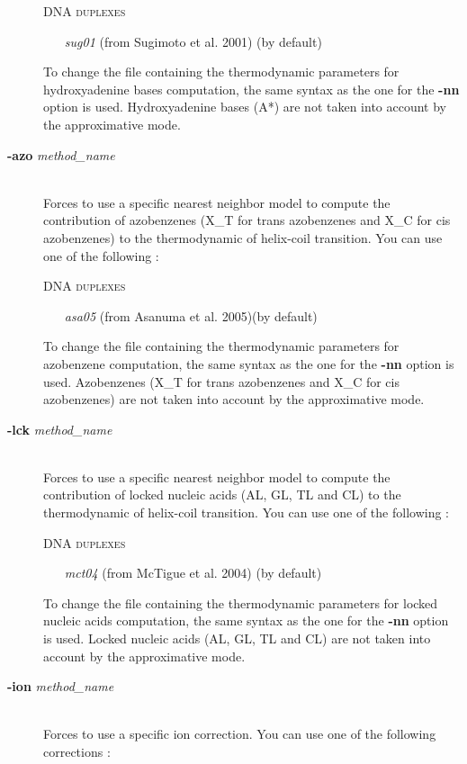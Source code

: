 \documentclass{article}
\begin{document}
\begin{description}
  \textsc{DNA duplexes}
    \begin{itemize}
    \item [\textit{sug01}] (from Sugimoto et al. 2001) (by default)
    \end{itemize}
  To change the file containing the thermodynamic parameters for hydroxyadenine bases computation, the same syntax as the one for the \textbf{-nn} option is used.
  Hydroxyadenine bases (A*) are not taken into account by the approximative mode.
\item [\textbf{-azo} \textit{method\_name}]\mbox{}\\ 
  Forces to use a specific nearest neighbor model to compute the contribution of azobenzenes (X\_T for trans azobenzenes and X\_C for cis azobenzenes) to the thermodynamic 
  of helix-coil transition. 
  You can use one of the following :
  
  \textsc{DNA duplexes}
    \begin{itemize}
    \item [\textit{asa05}] (from Asanuma et al. 2005)(by default)
    \end{itemize}
  To change the file containing the thermodynamic parameters for azobenzene computation, the same syntax as the one for the \textbf{-nn} option is used.
  Azobenzenes (X\_T for trans azobenzenes and X\_C for cis azobenzenes) are not taken into account by the approximative mode.
\item [\textbf{-lck} \textit{method\_name}]\mbox{}\\ 
  Forces to use a specific nearest neighbor model to compute the contribution of locked nucleic acids (AL, GL, TL and CL) to the thermodynamic 
  of helix-coil transition. 
  You can use one of the following :
  
  \textsc{DNA duplexes}
    \begin{itemize}
    \item [\textit{mct04}] (from McTigue et al. 2004) (by default)
    \end{itemize}
  To change the file containing the thermodynamic parameters for locked nucleic acids computation, the same syntax as the one for the \textbf{-nn} option is used.
  Locked nucleic acids (AL, GL, TL and CL) are not taken into account by the approximative mode.
\item [\textbf{-ion} \textit{method\_name}]\mbox{}\\ 
  Forces to use a specific ion correction. You can use one of the following corrections : 
    

\end{description}
\end{document}
